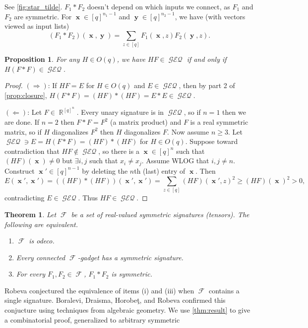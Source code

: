 \documentclass{article}
\newtheorem{theorem}{Theorem}[section]
\newtheorem{proposition}{Proposition}[section]
\theoremstyle{remark}
\theoremstyle{definition}
\DeclareMathOperator{\rr}{\mathbb{R}}
\DeclareMathOperator{\vx}{\mathbf{x}}
\DeclareMathOperator{\vy}{\mathbf{y}}
\DeclareMathOperator{\fc}{\mathcal{F}}
\DeclareMathOperator{\geneq}{\mathcal{GEQ}}
\begin{document}
See \autoref{fig:star_tilde}.
$F_1 * F_2$ doesn't depend on which inputs we connect, as $F_1$ and $F_2$ are symmetric.
For $\vx \in [q]^{n_1-1}$ and $\vy \in [q]^{n_2-1}$, we have (with vectors viewed as input lists)
\[
    (F_1 * F_2)(\vx,\vy) = \sum_{z \in [q]} F_1(\vx,z) F_2(\vy,z).
\]
\begin{proposition}
    \label{prop:odeco}
    For any $H \in O(q)$, we have
    $HF \in \geneq$ if and only if $H(F * F) \in \geneq$. 
\end{proposition}
\begin{proof}
    $(\Longrightarrow)$: If $HF = E$ for $H \in O(q)$ and $E \in \geneq$, then by part 2 of 
    \autoref{prop:closure}, $H(F * F) = (HF) * (HF) = E * E \in \geneq$.

    $(\Longleftarrow)$: Let $F \in \rr^{[q]^n}$. Every unary signature is in $\geneq$, so if $n=1$
    then we are done. If $n = 2$ then $F * F = F^2$ (a matrix product) and $F$ is a real symmetric
    matrix, so if $H$ diagonalizes $F^2$ then $H$ diagonalizes $F$.
    Now assume $n \geq 3$.
    Let $\geneq \ni E = H(F * F) = (HF) * (HF)$ for $H \in O(q)$.
    Suppose toward contradiction that $HF \not\in
    \geneq$, so there is a $\vx \in [q]^n$ such that $(HF)(\vx) \neq 0$ but $\exists i,j$ such that 
    $x_i \neq x_j$. Assume WLOG that
    $i,j \neq n$. Construct $\vx' \in [q]^{n-1}$ by deleting the $n$th (last) entry of $\vx$. Then
    \[
        E(\vx',\vx') = ((HF) * (HF))(\vx',\vx') = \sum_{z \in [q]} (HF)(\vx',z)^2 \geq (HF)(\vx)^2 > 0,
    \]
    contradicting $E \in \geneq$. Thus $HF \in \geneq$.
\end{proof}
\begin{theorem}
    \label{thm:odeco}
    Let $\fc$ be a set of real-valued symmetric signatures (tensors). The following are equivalent.
    \begin{enumerate}[label=(\roman*)]
        \item $\fc$ is odeco.
        \item Every connected $\fc$-gadget has a symmetric signature.
        \item For every $F_1,F_2 \in \fc$, $F_1 * F_2$ is symmetric.
    \end{enumerate}
\end{theorem}
Robeva \cite{robeva} conjectured the equivalence of items (i) and (iii) when $\fc$
contains a single signature.
Boralevi, Draisma, Horobeţ, and Robeva \cite{boralevi_orthogonal_2017} confirmed this conjucture
using techniques from algebraic geometry.
We use \autoref{thm:result} to give a combinatorial proof, generalized to arbitrary symmetric
\end{document}
